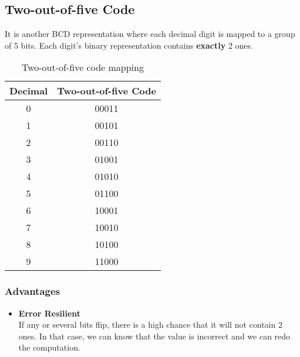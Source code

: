 \documentclass[oneside]{book}
\begin{document}
\subsection{Two-out-of-five Code}
It is another BCD representation where each decimal digit is mapped to a group of 5 bits. Each digit's binary representation contains \textbf{exactly} 2 ones.
\begin{table}[ht]
	\centering
	\begin{tabular}{|cc|}
		\hline
		Decimal & Two-out-of-five Code \\
		\hline
		0       & 00011                \\
		1       & 00101                \\
		2       & 00110                \\
		3       & 01001                \\
		4       & 01010                \\
		5       & 01100                \\
		6       & 10001                \\
		7       & 10010                \\
		8       & 10100                \\
		9       & 11000                \\
		\hline
	\end{tabular}
	\caption{Two-out-of-five code mapping}
\end{table}
\subsubsection{Advantages}
\begin{itemize}
	\item \textbf{Error Resilient}\\
	      If any or several bits flip, there is a high chance that it will not contain 2 ones. In that case, we can know that the value is incorrect and we can redo the computation.
\end{itemize}
\end{document}
